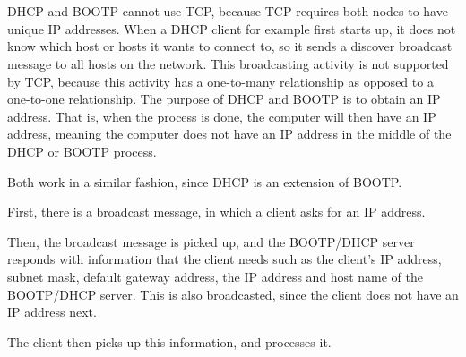 \section{}

DHCP and BOOTP cannot use TCP, because TCP requires both nodes to have unique
IP addresses. When a DHCP client for example first starts up, it does not know
which host or hosts it wants to connect to, so it sends a discover broadcast
message to all hosts on the network. This broadcasting activity is not supported
by TCP, because this activity has a one-to-many relationship as opposed to a
one-to-one relationship. The purpose of DHCP and BOOTP is to obtain an IP
address. That is, when the process is done, the computer will then have an IP
address, meaning the computer does not have an IP address in the middle of the
DHCP or BOOTP process. 

Both work in a similar fashion, since DHCP is an extension of BOOTP.

  First, there is a broadcast message, in which a client asks for an IP address.

  Then, the  broadcast message is picked up, and the BOOTP/DHCP server responds
    with information that the client needs such as the client’s IP address,
    subnet mask, default gateway address,  the IP address and host name of the
    BOOTP/DHCP server. This is also broadcasted, since the client does not have 
    an IP address next. 

    The client then picks up this information, and processes it. 

